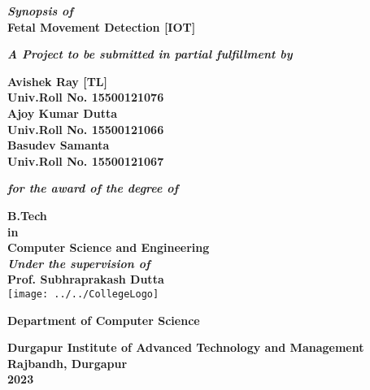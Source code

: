 \documentclass[12pt,a4paper,oneside]{report}
\begin{document}
	\thispagestyle{empty}
	\begin{center}
		{\textbf{\textit{Synopsis of}\\}}
		{\Large\bf{Fetal Movement Detection [IOT]} \\}
		
		
		\vspace{0.3in}
		
		
		{\textbf{\textit  {A Project to be submitted in partial fulfillment by\\}}}
		
		
		
		\vspace{0.4in}
		\textbf{\Large Avishek Ray [TL]
			\\ \small Univ.Roll No. 15500121076
			\\ \Large Ajoy Kumar Dutta
			\\ \small Univ.Roll No. 15500121066
			\\ \Large Basudev Samanta
			\\ \small Univ.Roll No. 15500121067\\}
		
		
		\vspace{0.3 in}
		
		{\bf\textit{for the award of the degree of}}
		
		\vspace {0.3 in}
		
		
		{\Large{\bf B.Tech \\ \small in \\\Large Computer Science and Engineering }\\}
		\vspace{0.3in}
		{\bf\textit{Under the supervision of\\ }}
		{\Large{\bf Prof. Subhraprakash Dutta}\\}    
		\vspace{0.3in}
		\texttt{[image: ../../CollegeLogo]}
		
		
		{\large\bf Department of Computer Science\\}
		
		{\large\bf  Durgapur Institute of Advanced Technology and Management \\}
		{\large\bf Rajbandh, Durgapur \\}
		{\large\bf  2023 }
	\end{center}
	\date{}
	\setcounter{page}{0}
	
\end{document}
